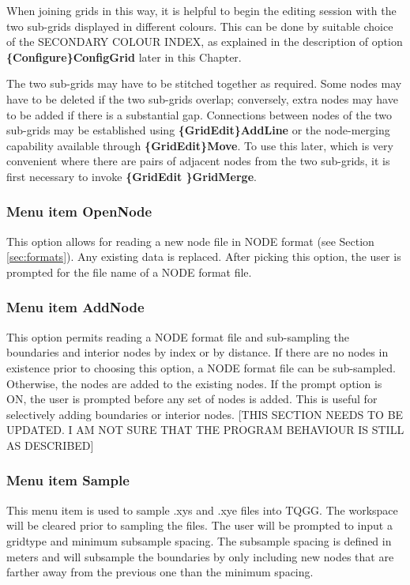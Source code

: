 \documentclass{article}
\begin{document}
When joining grids in this way, it is helpful to begin the editing session with the two sub-grids displayed in different colours. This can be done by suitable choice of the SECONDARY COLOUR INDEX, as explained in the description of option \textbf{\{Configure\}ConfigGrid} later in this Chapter.

The two sub-grids may have to be stitched together as required. Some nodes may have to be deleted if the two sub-grids overlap; conversely, extra nodes may have to be added if there is a substantial gap. Connections between nodes of the two sub-grids may be established using \textbf{\{GridEdit\}AddLine} or the node-merging capability available through \textbf{\{GridEdit\}Move}. To use this later, which is very convenient where there are pairs of adjacent nodes from the two sub-grids, it is first necessary to invoke \textbf{\{GridEdit \}GridMerge}.

\subsubsection[Menu item OpenNode]{Menu item OpenNode}
This option allows for reading a new node file in NODE format (see Section \ref{sec:formats}). Any existing data is replaced. After picking this option, the user is prompted for the file name of a NODE format file.

\subsubsection[Menu item AddNode]{Menu item AddNode}
This option permits reading a NODE format file and sub-sampling the boundaries and interior nodes by index or by distance. If there are no nodes in existence prior to choosing this option, a NODE format file can be sub-sampled. Otherwise, the nodes are added to the existing nodes. If the prompt option is ON, the user is prompted before any set of nodes is added. This is useful for selectively adding boundaries or interior nodes. [THIS SECTION NEEDS TO BE UPDATED.  I AM NOT SURE THAT THE PROGRAM BEHAVIOUR IS STILL AS DESCRIBED]

\subsubsection[Menu item Sample]{Menu item Sample}
This menu item is used to sample .xys and .xye files into TQGG. The workspace will be cleared prior to sampling the files.
The user will be prompted to input a gridtype and minimum subsample spacing. The subsample spacing is defined in meters and will subsample the boundaries by only including new nodes that are farther away from the previous one than the minimum spacing.
\end{document}
